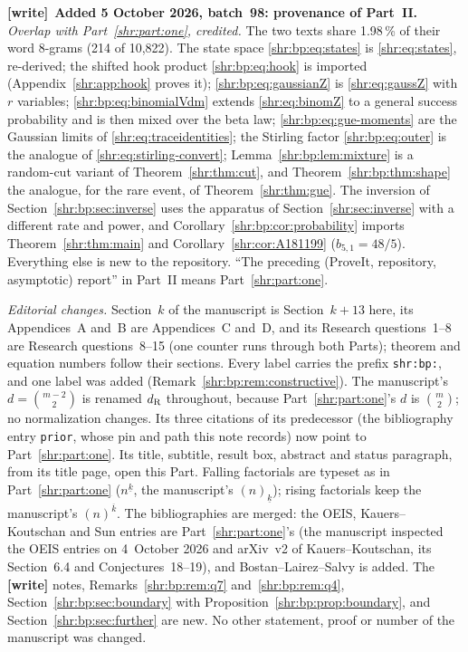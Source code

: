 \documentclass[11pt,letterpaper]{article}
\numberwithin{equation}{section}
\theoremstyle{definition}
\newcommand{\1}{\mathbf 1}
\newenvironment{writenote}[1][]{\par\smallskip\begingroup\small
 \noindent\textbf{[write]}\if\relax\detokenize{#1}\relax\else~\textbf{#1.}\fi\ }%
 {\par\endgroup\smallskip}
\begin{document}
\begin{writenote}[Added 5 October 2026, batch~98: provenance of Part~II]
\emph{Overlap with Part~\ref{shr:part:one}, credited.} The two texts share
1.98\,\% of their word 8-grams (214 of 10{,}822). The state space
\eqref{shr:bp:eq:states} is \eqref{shr:eq:states}, re-derived; the shifted
hook product \eqref{shr:bp:eq:hook} is imported (Appendix~\ref{shr:app:hook}
proves it); \eqref{shr:bp:eq:gaussianZ} is \eqref{shr:eq:gaussZ} with $r$
variables; \eqref{shr:bp:eq:binomialVdm} extends \eqref{shr:eq:binomZ} to a
general success probability and is then mixed over the beta law;
\eqref{shr:bp:eq:gue-moments} are the Gaussian limits of
\eqref{shr:eq:traceidentities}; the Stirling factor \eqref{shr:bp:eq:outer}
is the analogue of \eqref{shr:eq:stirling-convert};
Lemma~\ref{shr:bp:lem:mixture} is a random-cut variant of
Theorem~\ref{shr:thm:cut}, and Theorem~\ref{shr:bp:thm:shape} the analogue,
for the rare event, of Theorem~\ref{shr:thm:gue}. The inversion of
Section~\ref{shr:bp:sec:inverse} uses the apparatus of
Section~\ref{shr:sec:inverse} with a different rate and power, and
Corollary~\ref{shr:bp:cor:probability} imports Theorem~\ref{shr:thm:main}
and Corollary~\ref{shr:cor:A181199} ($b_{5,1}=48/5$). Everything else is
new to the repository. ``The preceding (ProveIt, repository, asymptotic)
report'' in Part~II means Part~\ref{shr:part:one}.

\emph{Editorial changes.} Section~$k$ of the manuscript is
Section~$k+13$ here, its Appendices~A and~B are Appendices~C and~D, and its
Research questions~1--8 are Research questions~8--15 (one counter runs
through both Parts); theorem and equation numbers follow their sections.
Every label carries the prefix \texttt{shr:bp:}, and one label was added
(Remark~\ref{shr:bp:rem:constructive}). The manuscript's $d=\binom{m-2}2$
is renamed $d_{\rm R}$ throughout, because Part~\ref{shr:part:one}'s $d$ is
$\binom m2$; no normalization changes. Its three citations of its
predecessor (the bibliography entry \texttt{prior}, whose pin and path this
note records) now point to Part~\ref{shr:part:one}. Its title, subtitle,
result box, abstract and status paragraph, from its title page, open this
Part. Falling factorials are typeset as in Part~\ref{shr:part:one}
($n^{\underline k}$, the manuscript's $(n)_{\underline k}$); rising
factorials keep the manuscript's $(n)^{\overline k}$. The bibliographies
are merged: the OEIS, Kauers--Koutschan and Sun entries are
Part~\ref{shr:part:one}'s (the manuscript inspected the OEIS entries on
4~October 2026 and arXiv~v2 of Kauers--Koutschan, its Section~6.4 and
Conjectures~18--19), and Bostan--Lairez--Salvy \cite{BLS} is added. The
\textbf{[write]} notes, Remarks~\ref{shr:bp:rem:q7}
and~\ref{shr:bp:rem:q4}, Section~\ref{shr:bp:sec:boundary} with
Proposition~\ref{shr:bp:prop:boundary}, and
Section~\ref{shr:bp:sec:further} are new. No other statement, proof or
number of the manuscript was changed.
\end{writenote}
\end{document}
